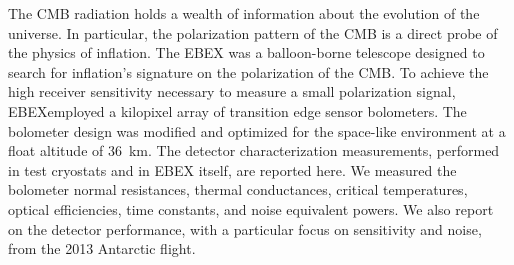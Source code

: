
The \ac{CMB} radiation holds a wealth of information about the evolution of the universe. 
In particular, the polarization pattern of the \ac{CMB} is a direct probe of the physics of inflation. 
The \ac{EBEX} was a balloon-borne telescope designed to search for inflation's signature on the polarization of the \ac{CMB}.  
To achieve the high receiver sensitivity necessary to measure a small polarization signal, \ac{EBEX}employed a kilopixel array of transition edge sensor bolometers. 
The bolometer design was modified and optimized for the space-like environment at a float altitude of 36~km. 
The detector characterization measurements, performed in test cryostats and in \ac{EBEX} itself, are reported here. 
We measured the bolometer normal resistances, thermal conductances, critical temperatures, optical efficiencies, time constants, and noise equivalent powers. 
We also report on the detector performance, with a particular focus on sensitivity and noise, from the 2013 Antarctic flight.



